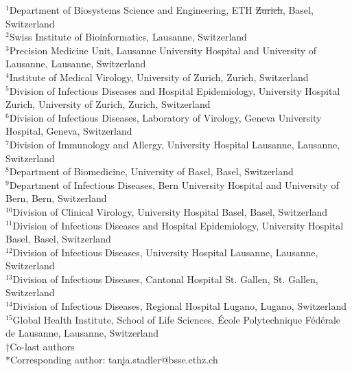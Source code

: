 \documentclass[12pt]{article} %
\providecommand{\DIFadd}[1]{{\protect\color{blue}\uwave{#1}}} %
\providecommand{\DIFdel}[1]{{\protect\color{red}\sout{#1}}}                      %
\providecommand{\DIFaddbegin}{} %
\providecommand{\DIFaddend}{} %
\providecommand{\DIFdelbegin}{} %
\providecommand{\DIFdelend}{} %
\newcommand{\DIFscaledelfig}{0.5}
\newlength{\DIFdelgraphicswidth} %
\newlength{\DIFdelgraphicsheight} %
\newcommand{\DIFaddincludegraphics}[2][]{{\color{blue}\fbox{\DIFOincludegraphics[#1]{#2}}}} %
\newcommand{\DIFdelincludegraphics}[2][]{%
\sbox{\DIFdelgraphicsbox}{\DIFOincludegraphics[#1]{#2}}%
\settoboxwidth{\DIFdelgraphicswidth}{\DIFdelgraphicsbox} %
\settoboxtotalheight{\DIFdelgraphicsheight}{\DIFdelgraphicsbox} %
\scalebox{\DIFscaledelfig}{%
\parbox[b]{\DIFdelgraphicswidth}{\usebox{\DIFdelgraphicsbox}\\[-\baselineskip] \rule{\DIFdelgraphicswidth}{0em}}\llap{\resizebox{\DIFdelgraphicswidth}{\DIFdelgraphicsheight}{%
\setlength{\unitlength}{\DIFdelgraphicswidth}%
\begin{picture}(1,1)%
\thicklines\linethickness{2pt} %
{\color[rgb]{1,0,0}\put(0,0){\framebox(1,1){}}}%
{\color[rgb]{1,0,0}\put(0,0){\line( 1,1){1}}}%
{\color[rgb]{1,0,0}\put(0,1){\line(1,-1){1}}}%
\end{picture}%
}\hspace*{3pt}}} %
} %
\DeclareRobustCommand{\DIFaddbegin}{\DIFOaddbegin \let\includegraphics\DIFaddincludegraphics} %
\DeclareRobustCommand{\DIFaddend}{\DIFOaddend \let\includegraphics\DIFOincludegraphics} %
\DeclareRobustCommand{\DIFdelbegin}{\DIFOdelbegin \let\includegraphics\DIFdelincludegraphics} %
\DeclareRobustCommand{\DIFdelend}{\DIFOaddend \let\includegraphics\DIFOincludegraphics} %
\begin{document}
\noindent
$^{1}$Department of Biosystems Science and Engineering, ETH \DIFdelbegin \DIFdel{Zurich}\DIFdelend \DIFaddbegin \DIFadd{Zürich}\DIFaddend , Basel, Switzerland\\
$^{2}$Swiss Institute of Bioinformatics, Lausanne, Switzerland\\ 
$^{3}$Precision Medicine Unit, Lausanne University Hospital and University of Lausanne, Lausanne, Switzerland\\ 
$^{4}$Institute of Medical Virology, University of Zurich, Zurich, Switzerland\\ 
$^{5}$Division of Infectious Diseases and Hospital Epidemiology, University Hospital Zurich, University of Zurich, Zurich, Switzerland\\
$^{6}$Division of Infectious Diseases, Laboratory of Virology, Geneva University Hospital, Geneva, Switzerland\\
$^{7}$Division of Immunology and Allergy, University Hospital Lausanne, Lausanne, Switzerland\\
$^{8}$Department of Biomedicine, University of Basel, Basel, Switzerland\\
$^{9}$Department of Infectious Diseases, Bern University Hospital and University of Bern, Bern, Switzerland\\
$^{10}$Division of Clinical Virology, University Hospital Basel, Basel, Switzerland\\
$^{11}$Division of Infectious Diseases and Hospital Epidemiology, University Hospital Basel, Basel, Switzerland\\
$^{12}$Division of Infectious Diseases, University Hospital Lausanne, Lausanne, Switzerland\\
$^{13}$Division of Infectious Diseases, Cantonal Hospital St. Gallen, St. Gallen, Switzerland\\
$^{14}$Division of Infectious Diseases, Regional Hospital Lugano, Lugano, Switzerland\\
$^{15}$Global Health Institute, School of Life Sciences, École Polytechnique Fédérale de Lausanne, Lausanne, Switzerland\\
$\dagger$Co-last authors\\
$*$Corresponding author: tanja.stadler@bsse.ethz.ch
\end{document}
